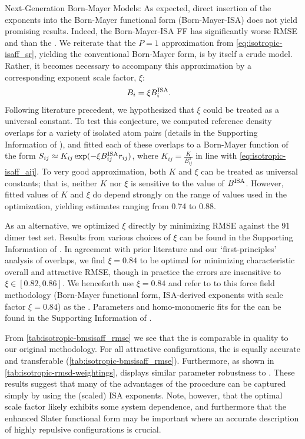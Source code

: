 \begin{subsection}{Next-Generation Born-Mayer Models: \bmsisaff}
As expected, direct insertion of the \bsisa exponents into the
Born-Mayer functional form (Born-Mayer-ISA) does not yield promising results.
Indeed, the Born-Mayer-ISA FF has significantly worse RMSE and \mse than
the \saptff. 
We reiterate that the $P = 1$ approximation from \cref{eq:isotropic-isaff_sr}, yielding the
conventional Born-Mayer form, is by itself a crude model.
Rather, it becomes necessary to accompany this approximation by a
corresponding exponent scale factor, $\xi$:
%
\begin{align}
\label{eq:isotropic-bmsisaff_bi}
B_i &= \xi B^{\text{ISA}}_{i}.
\end{align}
%
Following literature precedent, 
\cite{Ihm1990, McDaniel2012}
we hypothesized that $\xi$ could be treated as a
universal constant. To test this conjecture, we computed reference density overlaps for a
variety of isolated atom pairs (details in the Supporting Information of
), and
fitted each of these overlaps to a Born-Mayer function of the form 
$S_{ij} \approx K_{ij}\exp(-\xi B^{\text{ISA}}_{ij} r_{ij})$, where $K_{ij} =
\frac{K}{B^{3}_{ij}}$ in line with \cref{eq:isotropic-isaff_aij}. To very good
approximation, both $K$ and $\xi$ can be treated as universal constants;
that is, neither $K$ nor $\xi$ is sensitive to the value of $B^{\text{ISA}}_{}$.
However, fitted values of $K$ and $\xi$ do depend strongly on the range of \R values
used in the optimization, yielding estimates ranging from 0.74 to 0.88.

As an alternative, we optimized $\xi$ directly by minimizing RMSE
against the 91 dimer test set. Results from various choices
of $\xi$ can be found in the Supporting Information of .  In agreement
with prior literature and our `first-principles' analysis of overlaps, we find $\xi
= 0.84$ to be optimal for minimizing characteristic overall and attractive RMSE,
though in practice the errors are insensitive to $\xi \in [0.82,0.86]$.
We henceforth use $\xi=0.84$ and refer to to this force field methodology
(Born-Mayer functional form, ISA-derived exponents with
scale factor $\xi=0.84$) as the \bmsisaff. 
Parameters and homo-monomeric fits for the \bmsisaff
can be found in the Supporting Information of .

 
From \cref{tab:isotropic-bmsisaff_rmse} we see that the \bmsisaff is comparable in
quality to our original \isaffold methodology. 
For all attractive configurations, the \bmsisaff is equally
accurate and transferable (\cref{tab:isotropic-bmsisaff_rmse}). Furthermore, as shown in
\cref{tab:isotropic-rmsd-weightings}, \bmsisaff displays similar parameter robustness
to \isaffold. These results suggest that many of the advantages of the \isaffold
procedure can be captured simply by using the (scaled) ISA exponents.
Note, however, that the optimal scale factor likely exhibits some system dependence,
and furthermore that the enhanced Slater functional form may be important
where an accurate description of highly repulsive configurations is crucial.


\end{subsection}
